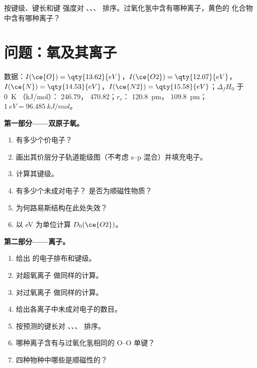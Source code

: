 \begin{exercise}[$\star\star\star$]\label{exo:b2:diatomic-mos:12}
按键级、键长和键
强度对 、、、 排序。过氧化氢中含有哪种离子，黄色的
化合物  中含有哪种离子？
\end{exercise}

\section{问题：氧及其离子}

\begin{problem}
\label{pb:b2:diatomic-mos:1}
数据：$I(\ce{O}) = \qty{13.62}{eV}$，$I(\ce{O2}) = \qty{12.07}{eV}$，$I(\ce{N}) =
\qty{14.53}{eV}$，$I(\ce{N2}) = \qty{15.58}{eV}$；$\Delta_f H_0$ 于 \qty{0}{K}
（\unit{kJ/mol}）： 246.79， 470.82；$r_e$： \qty{120.8}{pm}，
\qty{109.8}{pm}；$1\ \unit{eV} = \qty{96.485}{kJ/mol}$。

\medskip
\noindent\textbf{第一部分——双原子氧。}
\begin{enumerate}
  \item {} 有多少个价电子？
  \item 画出其价层分子轨道能级图（不考虑 s--p 混合）并填充电子。
  \item 计算其键级。
  \item 有多少个未成对电子？ 是否为顺磁性物质？
  \item 为何路易斯结构在此处失效？
  \item 以 \unit{eV} 为单位计算 $D_0(\ce{O2})$。
\end{enumerate}

\medskip
\noindent\textbf{第二部分——离子。}
\begin{enumerate}[resume]
  \item 给出  的电子排布和键级。
  \item 对超氧离子  做同样的计算。
  \item 对过氧离子  做同样的计算。
  \item 给出各离子中未成对电子的数目。
  \item 按预测的键长对 、、、 排序。
  \item 哪种离子含有与过氧化氢相同的 O--O 单键？
  \item 四种物种中哪些是顺磁性的？
\end{enumerate}


\end{problem}
